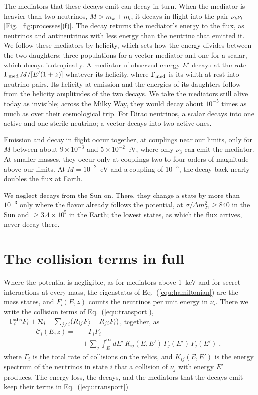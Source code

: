 \documentclass[linenumbers, aps, prd, twocolumn, superscriptaddress, floatfix, longbibliography, nofootinbib, bibnotes]{revtex4-2}
\begin{document}
The mediators that these decays emit can decay in turn.
When the mediator is heavier than two neutrinos, $M > m_k + m_l$, it decays in flight into the pair $\nu_k \nu_l$ [Fig.~\ref{fig:processes}(f)].
The decay returns the mediator's energy to the flux, as neutrinos and antineutrinos with less energy than the neutrino that emitted it.
We follow these mediators by helicity, which sets how the energy divides between the two daughters: three populations for a vector mediator and one for a scalar, which decays isotropically.
A mediator of observed energy $E'$ decays at the rate $\Gamma_{\rm med}\, M / [E'(1+z)]$ whatever its helicity, where $\Gamma_{\rm med}$ is its width at rest into neutrino pairs.
Its helicity at emission and the energies of its daughters follow from the helicity amplitudes of the two decays.
We take the mediators still alive today as invisible; across the Milky Way, they would decay about $10^{-5}$ times as much as over their cosmological trip.
For Dirac neutrinos, a scalar decays into one active and one sterile neutrino; a vector decays into two active ones.

Emission and decay in flight occur together, at couplings near our limits, only for $M$ between about $9 \times 10^{-3}$ and $5 \times 10^{-2}$~eV, where only $\nu_3$ can emit the mediator.
At smaller masses, they occur only at couplings two to four orders of magnitude above our limits.
At $M = 10^{-2}$~eV and a coupling of $10^{-5}$, the decay back nearly doubles the flux at Earth.

We neglect decays from the Sun on.
There, they change a state by more than $10^{-3}$ only where the flavor already follows the potential, at $\sigma / \Delta m^2_{21} \geq 840$ in the Sun and $\geq 3.4 \times 10^5$ in the Earth; the lowest states, as which the flux arrives, never decay there.

\section{The collision terms in full}
\label{app:si}
Where the potential is negligible, as for mediators above 1~keV and for secret interactions at every mass, the eigenstates of Eq.~(\ref{equ:hamiltonian}) are the mass states, and $F_i(E, z)$ counts the neutrinos per unit energy in $\nu_i$.
There we write the collision terms of Eq.~(\ref{equ:transport}), $-\Gamma^{\rm abs}_i F_i + \mathcal{R}_i + \sum_{j \neq i} (R_{ij} F_j - R_{ji} F_i)$, together, as
\begin{equation}
 \label{equ:collisions}
 \begin{split}
 \mathcal{C}_i(E, z) = \; & -\Gamma_i F_i \\
 & + \sum_j \int_E^\infty dE'\, K_{ij}(E, E')\, \Gamma_j(E')\, F_j(E') \;,
 \end{split}
\end{equation}
where $\Gamma_i$ is the total rate of collisions on the relics, and $K_{ij}(E, E')$ is the energy spectrum of the neutrinos in state $i$ that a collision of $\nu_j$ with energy $E'$ produces.
The energy loss, the decays, and the mediators that the decays emit keep their terms in Eq.~(\ref{equ:transport}).
\end{document}
